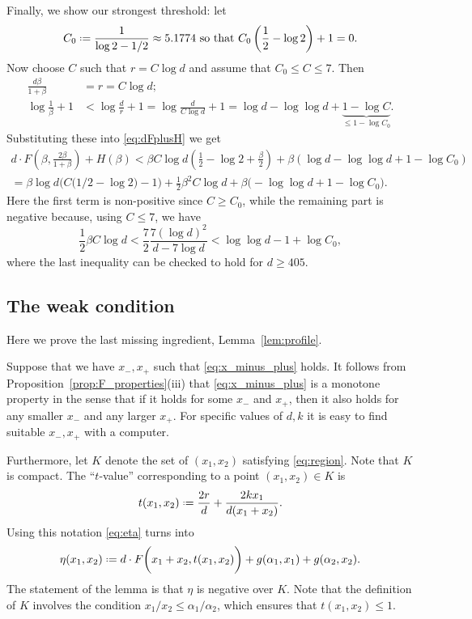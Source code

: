 \documentclass[12pt]{amsart}
\theoremstyle{definition}
\newcommand\al{\alpha}
\newcommand\be{\beta}
\newcommand{\defeq}{\mathrel{\vcenter{\baselineskip0.5ex \lineskiplimit0pt
                     \hbox{\scriptsize.}\hbox{\scriptsize.}}}%
                     =}
\begin{document}
Finally, we show our strongest threshold: let 
%
\[ C_0 \defeq \frac{1}{\log 2 - 1/2} \approx 5.1774 
\text{ so that } 
C_0\left(\frac12 - \log 2\right)+1 = 0 .\]
%
Now choose $C$ such that $r=C \log d$ and assume that $C_0 \leq C \leq 7$. Then 
%
\begin{align*}
\frac{d\be}{1+\be} &= r = C \log d; \\ 
\log \frac{1}{\be} + 1 &< \log \frac{d}{r} + 1 
= \log \frac{d}{C \log d} + 1 
= \log d - \log \log d 
+ \underbrace{1 - \log C}_{\leq 1-\log C_0} .
\end{align*}
%
Substituting these into \eqref{eq:dFplusH} we get 
%
%
\begin{multline*}
d \cdot F\left( \be, \frac{2\be}{1+\be} \right) + H(\be) 
< \be C \log d \left( \frac12 - \log 2 + \frac{\be}{2}  \right) + \be \left( \log d - \log \log d + 1 - \log C_0 \right) \\
= \be\log d \bigg( C \big( 1/2 - \log 2 \big) - 1 \bigg) 
+ \frac12 \be^2 C \log d 
+ \be \bigg(- \log \log d + 1 - \log C_0 \bigg) .
\end{multline*}
%
Here the first term is non-positive since $C \geq C_0$, while the remaining part is negative because, using $C \leq 7$, we have
%
\[ \frac12 \be C \log d 
< \frac{7}{2} \frac{7 (\log d)^2}{d-7 \log d} 
< \log\log d - 1 + \log C_0 ,\]
where the last inequality can be checked to hold for $d \geq 405$.


\subsection{The weak condition}
\label{sec:weak}

Here we prove the last missing ingredient, Lemma~\ref{lem:profile}.

Suppose that we have $x_-,x_+$ such that \eqref{eq:x_minus_plus} holds. It follows from Proposition~\ref{prop:F_properties}(iii) that \eqref{eq:x_minus_plus} is a monotone property in the sense that if it holds for some $x_-$ and $x_+$, then it also holds for any smaller $x_-$ and any larger $x_+$. For specific values of $d,k$ it is easy to find suitable $x_-,x_+$ with a computer. 

Furthermore, let $K$ denote the set of $(x_1,x_2)$ satisfying \eqref{eq:region}. Note that $K$ is compact. The ``$t$-value'' corresponding to a point $(x_1,x_2) \in K$ is 
%
\[ t(x_1,x_2) \defeq 
\frac{2r}{d} + \frac{2kx_1}{d(x_1+x_2)} .\]
%
Using this notation \eqref{eq:eta} turns into 
%
\[ \eta(x_1,x_2) \defeq 
d \cdot F\bigg( x_1+x_2, t(x_1,x_2) \bigg)
+g(\al_1,x_1)+g(\al_2,x_2) .\]
%
The statement of the lemma is that $\eta$ is negative over $K$. Note that the definition of $K$ involves the condition $x_1/x_2 \leq \al_1 / \al_2$, which ensures that $t(x_1,x_2) \leq 1$.
\end{document}
